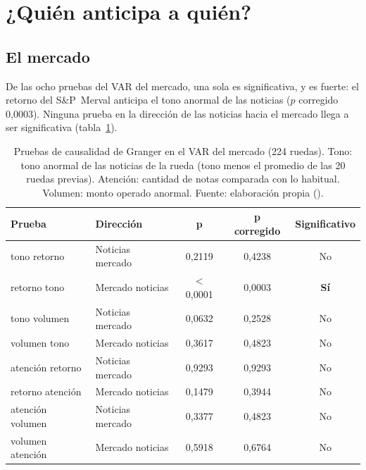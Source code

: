 \section{¿Quién anticipa a quién?}
\label{sec:res-u6}

\subsection{El mercado}

De las ocho pruebas del VAR del mercado, una sola es significativa, y es fuerte: el retorno del
S\&P~Merval anticipa el tono anormal de las noticias ($p$ corregido 0,0003). Ninguna prueba en la
dirección de las noticias hacia el mercado llega a ser significativa (tabla~\ref{tab:u6-mercado}).

\begin{table}[H]
\centering\small
\begin{tabular}{@{}llccc@{}}
\toprule
\textbf{Prueba} & \textbf{Dirección} & \textbf{p} & \textbf{p corregido} & \textbf{Significativo} \\
\midrule
tono \flecha{} retorno & Noticias \flecha{} mercado & 0,2119 & 0,4238 & No \\
retorno \flecha{} tono & Mercado \flecha{} noticias & $<$0,0001 & 0,0003 & \textbf{Sí} \\
tono \flecha{} volumen & Noticias \flecha{} mercado & 0,0632 & 0,2528 & No \\
volumen \flecha{} tono & Mercado \flecha{} noticias & 0,3617 & 0,4823 & No \\
atención \flecha{} retorno & Noticias \flecha{} mercado & 0,9293 & 0,9293 & No \\
retorno \flecha{} atención & Mercado \flecha{} noticias & 0,1479 & 0,3944 & No \\
atención \flecha{} volumen & Noticias \flecha{} mercado & 0,3377 & 0,4823 & No \\
volumen \flecha{} atención & Mercado \flecha{} noticias & 0,5918 & 0,6764 & No \\
\bottomrule
\end{tabular}
\caption{Pruebas de causalidad de Granger en el VAR del mercado (224 ruedas). Tono: tono anormal
de las noticias de la rueda (tono menos el promedio de las 20 ruedas previas). Atención: cantidad
de notas comparada con lo habitual. Volumen: monto operado anormal. Fuente: elaboración propia
().}
\label{tab:u6-mercado}
\end{table}

